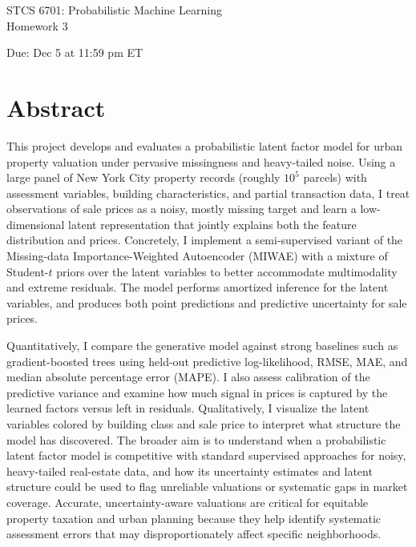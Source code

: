 \documentclass[11pt]{article}
\begin{document}
\begin{center}
{\Large STCS 6701: Probabilistic Machine Learning\\
Homework 3}

\vspace{1em}

Due: Dec 5 at 11:59 pm ET
\end{center}

\section*{Abstract}

This project develops and evaluates a probabilistic latent factor model for urban property valuation under pervasive missingness and heavy-tailed noise. Using a large panel of New York City property records (roughly $10^5$ parcels) with assessment variables, building characteristics, and partial transaction data, I treat observations of sale prices as a noisy, mostly missing target and learn a low-dimensional latent representation that jointly explains both the feature distribution and prices. Concretely, I implement a semi-supervised variant of the Missing-data Importance-Weighted Autoencoder (MIWAE) with a mixture of Student-$t$ priors over the latent variables to better accommodate multimodality and extreme residuals. The model performs amortized inference for the latent variables, and produces both point predictions and predictive uncertainty for sale prices.

Quantitatively, I compare the generative model against strong baselines such as gradient-boosted trees using held-out predictive log-likelihood, RMSE, MAE, and median absolute percentage error (MAPE). I also assess calibration of the predictive variance and examine how much signal in prices is captured by the learned factors versus left in residuals. Qualitatively, I visualize the latent variables colored by building class and sale price to interpret what structure the model has discovered. The broader aim is to understand when a probabilistic latent factor model is competitive with standard supervised approaches for noisy, heavy-tailed real-estate data, and how its uncertainty estimates and latent structure could be used to flag unreliable valuations or systematic gaps in market coverage. Accurate, uncertainty-aware valuations are critical for equitable property taxation and urban planning because they help identify systematic assessment errors that may disproportionately affect specific neighborhoods.
\end{document}
